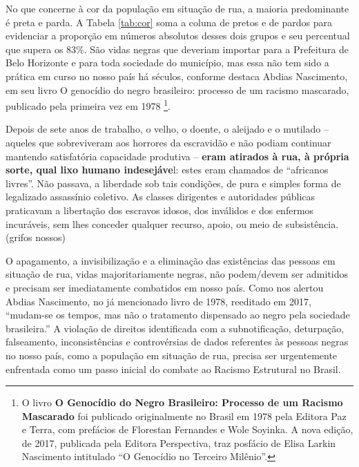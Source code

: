 \documentclass[12pt]{article}
\begin{document}
No que concerne à cor da população em situação de rua, a maioria predominante é preta e parda. A Tabela \ref{tab:cor} soma a coluna de pretos e de pardos para evidenciar a proporção em números absolutos desses dois grupos e seu percentual que supera os 83\%. São vidas negras que deveriam importar para a Prefeitura de Belo Horizonte e para toda sociedade do município, mas essa não tem sido a prática em curso no nosso país há séculos, conforme destaca Abdias Nascimento, em seu livro O genocídio do negro brasileiro: processo de um racismo mascarado, publicado pela primeira vez em 1978 \citep{abdias} \footnote{O livro \textbf{O Genocídio do Negro Brasileiro: Processo de um Racismo Mascarado} foi publicado originalmente no Brasil em 1978 pela Editora Paz e Terra, com prefácios de Florestan Fernandes e Wole Soyinka. A nova edição, de 2017, publicada pela Editora Perspectiva, traz posfácio de Elisa Larkin Nascimento intitulado ``O Genocídio no Terceiro Milênio”.}. 

\begin{trivlist}\leftskip=2.5cm
\item Depois de sete anos de trabalho, o velho, o doente, o aleijado e o mutilado – aqueles que sobreviveram aos horrores da escravidão e não podiam continuar mantendo satisfatória capacidade produtiva – \textbf{eram atirados à rua, à própria sorte, qual lixo humano indesejáve}l: estes eram chamados de “africanos livres”. Não passava, a liberdade sob tais condições, de pura e simples forma de legalizado assassínio coletivo. As classes dirigentes e autoridades públicas praticavam a libertação dos escravos idosos, dos inválidos e dos enfermos incuráveis, sem lhes conceder qualquer recurso, apoio, ou meio de subsistência. \citep[p.~79]{abdias} (grifos nossos)
\end{trivlist}

O apagamento, a invisibilização e a eliminação das existências das pessoas em situação de rua, vidas majoritariamente negras, não podem/devem ser admitidos e precisam ser imediatamente combatidos em nosso país. Como nos alertou Abdias Nascimento, no já mencionado livro de 1978, reeditado em 2017, “mudam-se os tempos, mas não o tratamento dispensado ao negro pela sociedade brasileira.” \citep[p.~134]{abdias} A violação de direitos identificada com a subnotificação, deturpação, falseamento, inconsistências e controvérsias de dados referentes às pessoas negras no nosso país, como a população em situação de rua, precisa ser urgentemente enfrentada como um passo inicial do combate ao Racismo Estrutural no Brasil.\\
\end{document}
